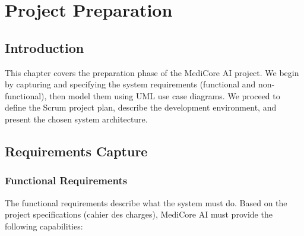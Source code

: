 \documentclass[12pt,a4paper,oneside]{report}
\begin{document}
\chapter{Project Preparation}

\section{Introduction}
This chapter covers the preparation phase of the MediCore AI project. We begin by capturing and specifying the system requirements (functional and non-functional), then model them using UML use case diagrams. We proceed to define the Scrum project plan, describe the development environment, and present the chosen system architecture.

\section{Requirements Capture}

\subsection{Functional Requirements}
The functional requirements describe what the system must do. Based on the project specifications (cahier des charges), MediCore AI must provide the following capabilities:
\end{document}
